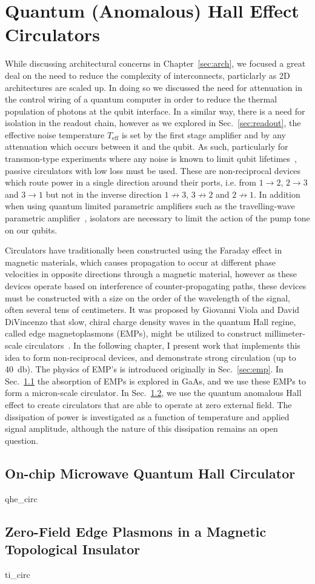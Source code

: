\chapter{Quantum (Anomalous) Hall Effect Circulators}
\label{sec:hall}

While discussing architectural concerns in Chapter~\ref{sec:arch}, we focused a great deal on the need to reduce the complexity of interconnects,
particlarly as 2D architectures are scaled up. In doing so we discussed the need for attenuation in the control wiring of a quantum computer in order
to reduce the thermal population of photons at the qubit interface. In a similar way, there is a need for isolation in the readout chain, however
as we explored in Sec.~\ref{sec:readout}, the effective noise temperature $T_\textrm{eff}$ is set by the first stage amplifier and by any attenuation
which occurs between it and the qubit. As such, particularly for transmon-type experiments where any noise is known to limit qubit
lifetimes~\cite{PhysRevLett.101.080502}, passive circulators with low loss must be used. These are non-reciprocal devices which route power
in a single direction around their ports, i.e. from $1 \to 2$, $2 \to 3$ and $3 \to 1$ but not in the inverse direction $1 \not\to 3$, $3 \not\to 2$
and $2 \not\to 1$. In addition when using quantum limited parametric amplifiers such as the travelling-wave parametric amplifier~\cite{PhysRevLett.113.157001},
isolators are necessary to limit the action of the pump tone on our qubits.

Circulators have traditionally been constructed using the Faraday effect in magnetic materials, which causes propagation to occur at different phase
velocities in opposite directions through a magnetic material, however as these devices operate based on interference of counter-propagating
paths, these devices must be constructed with a size on the order of the wavelength of the signal, often several tens of centimeters. It was proposed by
Giovanni Viola and David DiVincenzo that slow, chiral charge density waves in the quantum Hall regine, called edge magnetoplasmons (EMPs), might be utilized to
construct millimeter-scale circulators~\cite{PhysRevX.4.021019}. In the following chapter, I present work that implements this idea to form non-reciprocal devices,
and demonstrate strong circulation (up to \SI{40}{\decibel}). The physics of EMP's is introduced originally in Sec.~\ref{sec:emp}. In Sec.~\ref{sec:hallcirc} the
absorption of EMPs is explored in GaAs, and we use these EMPs to form a micron-scale circulator. In Sec.~\ref{sec:spinhallcirc}, we use the quantum anomalous Hall
effect to create circulators that are able to operate at zero external field. The dissipation of power is investigated as a function of temperature and applied signal
amplitude, although the nature of this dissipation remains an open question.

\clearpage
\section{On-chip Microwave Quantum Hall Circulator}
\label{sec:hallcirc}
{qhe_circ}

\clearpage
\section{Zero-Field Edge Plasmons in a Magnetic Topological Insulator}
\label{sec:spinhallcirc}
{ti_circ}
